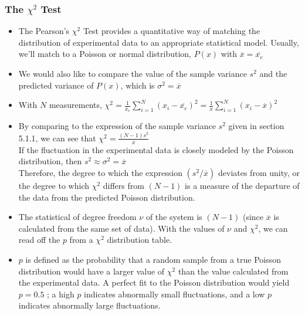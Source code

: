 \subsubsection{The \texorpdfstring{$\chi^2$}{Chi-squared} Test}
\begin{itemize}
    \item The Pearson's $\chi^2$ Test provides a quantitative way of matching the distribution of experimental data to an appropriate statistical model. Usually, we'll match to a Poisson or normal distribution, $P(x)$ with $\overline{x}=\overline{x_e}$
    \item We would also like to compare the value of the sample variance  $s^2$ and the predicted variance of $P(x)$, which is $\sigma^2=\overline{x}$
    \item With $N$ measurements, $\chi^2=\frac{1}{\overline{x_e}}\sum_{i=1}^{N}(x_i-\overline{x_e})^2=\frac{1}{\overline{x}}\sum_{i=1}^{N}(x_i-\overline{x})^2$
    \item By comparing to the expression of the sample variance $s^2$ given in section 5.1.1, we can see that $\chi^2=\frac{(N-1)s^2}{\overline{x}}$\\
    If the fluctuation in the experimental data is closely modeled by the Poisson distribution, then $s^2\approx\sigma^2=\overline{x}$\\
    Therefore, the degree to which the expression $(s^2/\overline{x})$ deviates from unity, or the degree to which $\chi^2$ differs from $(N-1)$ is a measure of the departure of the data from the predicted Poisson distribution.
    \item The statistical of degree freedom $\nu$ of the system is $(N-1)$ (since $\overline{x}$ is calculated from the same set of data). With the values of $\nu$ and $\chi^2$, we can read off the $p$ from a $\chi^2$ distribution table.
    \item $p$ is defined as the probability that a random sample from a true Poisson distribution would have a larger value of $\chi^2$ than the value calculated from the experimental data. A perfect fit to the Poisson distribution would yield $p=0.5$ ; a high $p$ indicates abnormally small fluctuations, and a low $p$ indicates abnormally large fluctuations.
\end{itemize}
